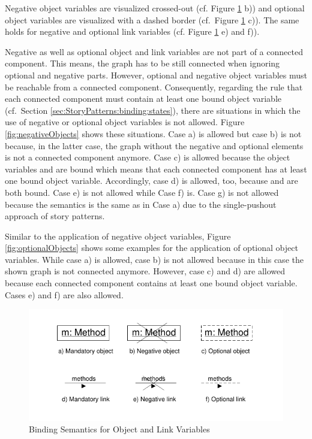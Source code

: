 Negative object variables are visualized crossed-out (cf. Figure
\ref{fig:bindingSemanticsOverview} b)) and optional object variables are
visualized with a dashed border (cf.\ Figure \ref{fig:bindingSemanticsOverview} c)).
The same holds for negative and optional link variables (cf. Figure
\ref{fig:bindingSemanticsOverview} e) and f)).

Negative as well as optional object and link variables are not part of a
connected component.
This means, the graph has to be still connected when ignoring optional and negative
parts. However, optional and negative object variables must be reachable from a connected component. 
Consequently, regarding the rule that each connected component must
contain at least one bound object variable (cf.\ Section
\ref{sec:StoryPatterns:binding:states}), there are situations in which the
use of negative or optional object variables is not allowed. 
Figure \ref{fig:negativeObjects} shows these situations. 
Case a) is allowed but case b) is not because, in the latter case,
the graph without the negative and optional elements is not a connected component anymore.
Case c) is allowed because the object
variables  and  are bound which means that each connected component has at least one bound object variable.
Accordingly, case d) is allowed, too, because  and  are both
bound. Case e) is not allowed while Case f) is.
Case g) is not allowed because the semantics is the same as in Case a) due to the single-pushout approach of story patterns.

Similar to the application of negative object
variables, Figure \ref{fig:optionalObjects} shows some examples for the application of optional object variables. 
While case a) is allowed, case b) is not allowed because in this case the
shown graph is not connected anymore. However, case c) and d) are allowed
because each connected component contains at least one bound object variable.
Cases e) and f) are also allowed.

\begin{figure}[htb]
  \centering
  \includegraphics[scale=1.2]{figures/BindingSemanticsOverview}
  \caption{Binding Semantics for Object and Link Variables}
  \label{fig:bindingSemanticsOverview}
\end{figure}

